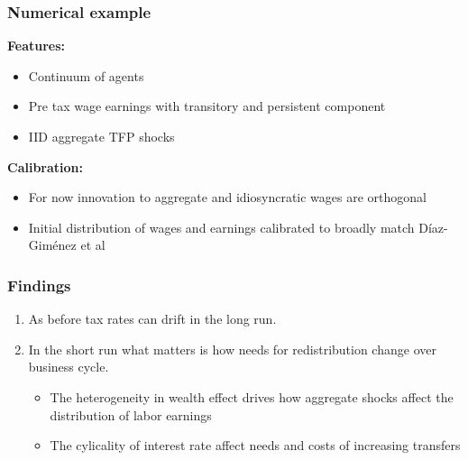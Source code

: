 \documentclass{beamer}
\begin{document}
\begin{frame}
 \frametitle{Numerical example}
 
 
\textbf{Features:} 
\begin{itemize}
\item Continuum of agents
 
 \item Pre tax wage earnings with transitory and persistent component
 \item IID aggregate TFP shocks
 
 \end{itemize}
 
\textbf{Calibration:} 
 \begin{itemize}
 \item For now innovation to aggregate and idiosyncratic wages are orthogonal
 \item  Initial distribution of wages and earnings calibrated  to broadly match Díaz-Giménez et al
 
\end{itemize}
 
 \vspace{3mm}

 \color{red}{Study responses to aggregate shocks}

 
 \end{frame}

 
 \begin{frame}
  \frametitle{Findings}
  \begin{enumerate}

\item As before tax rates can drift in the long run.
\vspace{3mm}
\item In the short run what matters is how needs for redistribution change over business cycle.
\begin{itemize}

\item The heterogeneity in wealth effect drives how aggregate shocks affect the distribution of labor earnings
\item The cylicality of interest rate affect needs and costs of increasing transfers

\end{itemize}

\end{enumerate}


  \end{frame}
\end{document}
